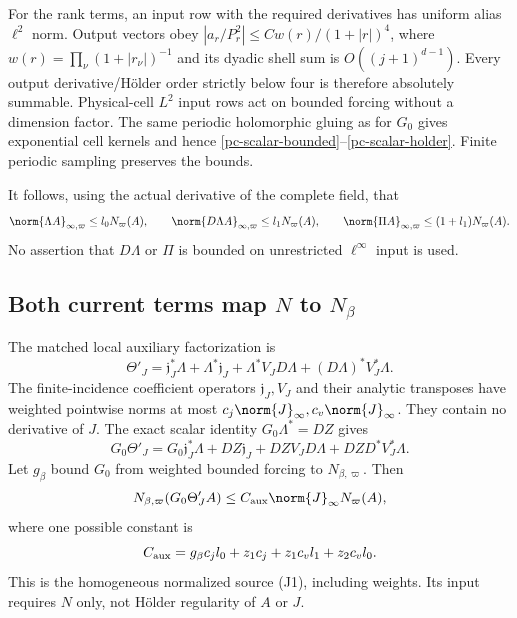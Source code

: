 For the rank terms, an input row with the required derivatives has
uniform alias $\ell^2$ norm. Output vectors obey
$|a_r/P_r^2|\le Cw(r)/(1+|r|)^4$, where
$w(r)=\prod_\nu(1+|r_\nu|)^{-1}$ and its dyadic shell sum is
$O((j+1)^{d-1})$. Every output derivative/H\"older order strictly
below four is therefore absolutely summable. Physical-cell $L^2$
input rows act on bounded forcing without a dimension factor.
The same periodic holomorphic gluing as for $G_0$ gives exponential
cell kernels and hence \eqref{pc-scalar-bounded}--\eqref{pc-scalar-holder}.
Finite periodic sampling preserves the bounds.

It follows, using the actual derivative of the complete field, that
\begin{equation}\label{pc-lambda-on-N}
 \norm{\Lambda A}_{\infty,\varpi}\le l_0N_\varpi(A),\qquad
 \norm{D\Lambda A}_{\infty,\varpi}\le l_1N_\varpi(A),\qquad
 \norm{\Pi A}_{\infty,\varpi}\le(1+l_1)N_\varpi(A).
\end{equation}
No assertion that $D\Lambda$ or $\Pi$ is bounded on unrestricted
$\ell^\infty$ input is used.

\subsection{Both current terms map $N$ to $N_\beta$}

The matched local auxiliary factorization is
\begin{equation}\label{pc-aux-factorization}
 \Theta'_J=\mathfrak j_J^*\Lambda+\Lambda^*\mathfrak j_J
       +\Lambda^*V_JD\Lambda+(D\Lambda)^*V_J^*\Lambda.
\end{equation}
The finite-incidence coefficient operators $\mathfrak j_J,V_J$
and their analytic transposes have weighted pointwise norms at most
$c_j\norm{J}_\infty,c_v\norm{J}_\infty$. They contain no derivative
of $J$. The exact scalar identity $G_0\Lambda^*=DZ$ gives
\begin{equation}\label{pc-outer-aux-smoothing}
 G_0\Theta'_J
  =G_0\mathfrak j_J^*\Lambda+DZ\mathfrak j_J
       +DZV_JD\Lambda+DZD^*V_J^*\Lambda.
\end{equation}
Let $g_\beta$ bound $G_0$ from weighted bounded forcing to
$N_{\beta,\varpi}$. Then
\begin{equation}\label{pc-aux-N-bound}
 N_{\beta,\varpi}(G_0\Theta'_JA)
        \le C_{\rm aux}\norm{J}_\infty N_\varpi(A),
\end{equation}
where one possible constant is
\[
 C_{\rm aux}=g_\beta c_jl_0+z_1c_j+z_1c_vl_1+z_2c_vl_0.
\]
This is the homogeneous normalized source (J1), including weights.
Its input requires $N$ only, not H\"older regularity of $A$ or $J$.

